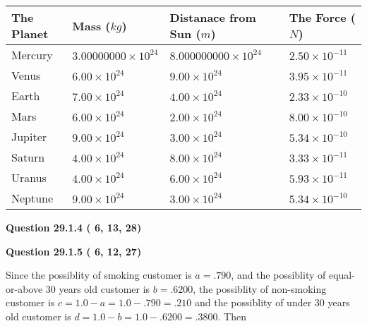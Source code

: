 \documentclass[12pt]{article}
\begin{document}
 
\begin{tabular}{|l|l|l|l|}
\hline
The Planet & Mass ($kg$) & Distanace from Sun ($m$) & The Force ($N$)\\
\hline
Mercury  &
           $ %
3.00000000 \times 10^{24} $   &
             $ %
8.000000000 \times 10^{24} $    & $ %
2.50 \times 10^{-11} $
\\  \hline
Venus    &
           $  %
6.00 \times 10^{24}  $     &
             $ %
9.00 \times 10^{24} $    & $ %
3.95 \times 10^{-11} $
\\  \hline
Earth    &
           $  %
7.00 \times 10^{24}  $     &
             $ %
4.00 \times 10^{24} $    & $ %
2.33 \times 10^{-10} $
\\   \hline
Mars     &
           $  %
6.00 \times 10^{24} $     &
             $ %
2.00 \times 10^{24} $    & $ %
8.00 \times 10^{-10} $
\\   \hline
Jupiter  &
           $  %
9.00 \times 10^{24} $    &
             $ %
3.00 \times 10^{24} $    & $ %
5.34 \times 10^{-10} $
\\  \hline
Saturn   &
           $  %
4.00 \times 10^{24} $    &
             $ %
8.00 \times 10^{24}  $    & $ %
3.33 \times 10^{-11} $
\\  \hline
Uranus   &
           $  %
4.00 \times 10^{24} $    &
             $ %
6.00 \times 10^{24} $    & $ %
5.93 \times 10^{-11} $
\\  \hline
Neptune  &
           $  %
9.00 \times 10^{24} $    &
             $ %
3.00 \times 10^{24} $    & $ %
5.34 \times 10^{-10} $
\\  \hline
 
\end{tabular}
 
 
 
 
  
\vspace{0.2in}
  
{\textbf{\Large{Question
29.1.4 
 (          6,         13,         28)
}}}
  
  
  
\vspace{0.2in}
  
{\textbf{\Large{Question
29.1.5 
 (          6,         12,         27)
}}}
  
  
 
 

Since the possiblity of  %
smoking customer is $ a =  %
.790 $,
and the possiblity of  %
equal-or-above 30 years old customer is $ b =  %
.6200 $,
the possiblity of  %
non-smoking customer is $ c = 1.0 - a = 1.0 -
.790
=  %
.210 $ and the possiblity of  %
under 30 years old
customer is $ d = 1.0 - b = 1.0 -  %
.6200 =  %
.3800  $.
Then
 
\end{document}
